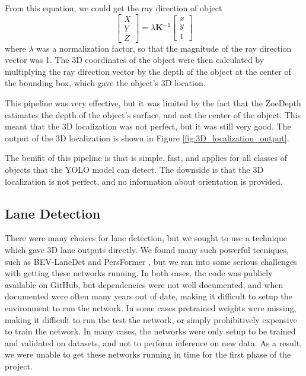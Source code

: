 From this equation, we could get the ray direction of object
\begin{equation}\label{eq:ray_direction}
    \begin{bmatrix}
        X \\
        Y \\
        Z
    \end{bmatrix}
    =
    \lambda \mathbf{K}^{-1}\begin{bmatrix}
        x \\
        y \\
        1
    \end{bmatrix} 
\end{equation}
where $\lambda$ was a normalization factor, so that the magnitude of the ray direction vector was 1. The 3D coordinates of the object were then calculated by multiplying the ray direction vector by the depth of the object at the center of the bounding box, which gave the object's 3D location.

This pipeline was very effective, but it was limited by the fact that the ZoeDepth estimates the depth of the object's surface, and not the center of the object. This meant that the 3D localization was not perfect, but it was still very good. The output of the 3D localization is shown in Figure \ref{fig:3D_localization_output}.

The benifit of this pipeline is that is simple, fast, and applies for all classes of objects that the YOLO model can detect. The downside is that the 3D localization is not perfect, and no information about orientation is provided.


\subsection{Lane Detection}
There were many choices for lane detection, but we sought to use a technique which gave 3D lane outputs directly. We found many such powerful tecniques, such as BEV-LaneDet \cite{BEV-LaneDet} and PersFormer \cite{PersFormer}, but we ran into some serious challenges with getting these networks running. In both cases, the code was publicly available on GitHub, but dependencies were not well documented, and when documented were often many years out of date, making it difficult to setup the environment to run the network. In some cases pretrained weights were missing, making it difficult to run the test the network, or simply prohibitively expensive to train the network. In many cases, the networks were only setup to be trained and validated on datasets, and not to perform inference on new data. As a result, we were unable to get these networks running in time for the first phase of the project.

